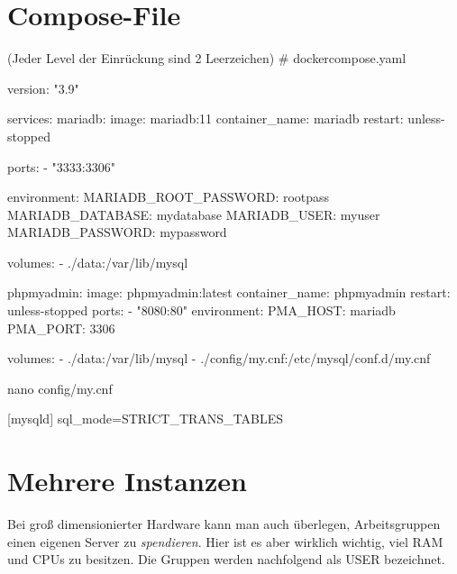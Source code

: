 \documentclass[
  ngerman,
  letterpaper,
  DIV=11]{scrreprt}
\newenvironment{Shaded}{\begin{snugshade}}{\end{snugshade}}
\newcommand{\ExtensionTok}[1]{\textcolor[rgb]{0.00,0.23,0.31}{#1}}
\newcommand{\NormalTok}[1]{\textcolor[rgb]{0.00,0.23,0.31}{#1}}
\newcommand{\StringTok}[1]{\textcolor[rgb]{0.13,0.47,0.30}{#1}}
\begin{document}
\chapter{Compose-File}\label{compose-file}

(Jeder Level der Einrückung sind 2 Leerzeichen) \# dockercompose.yaml

\begin{Shaded}
\begin{Highlighting}[]
\ExtensionTok{version:} \StringTok{"3.9"}

\ExtensionTok{services:}
  \ExtensionTok{mariadb:}
    \ExtensionTok{image:}\NormalTok{ mariadb:11}
    \ExtensionTok{container\_name:}\NormalTok{ mariadb}
    \ExtensionTok{restart:}\NormalTok{ unless{-}stopped}

    \ExtensionTok{ports:}
      \ExtensionTok{{-}} \StringTok{"3333:3306"}

    \ExtensionTok{environment:}
      \ExtensionTok{MARIADB\_ROOT\_PASSWORD:}\NormalTok{ rootpass}
      \ExtensionTok{MARIADB\_DATABASE:}\NormalTok{ mydatabase}
      \ExtensionTok{MARIADB\_USER:}\NormalTok{ myuser}
      \ExtensionTok{MARIADB\_PASSWORD:}\NormalTok{ mypassword}

    \ExtensionTok{volumes:}
      \ExtensionTok{{-}}\NormalTok{ ./data:/var/lib/mysql}
      
      
  \ExtensionTok{phpmyadmin:}
    \ExtensionTok{image:}\NormalTok{ phpmyadmin:latest}
    \ExtensionTok{container\_name:}\NormalTok{ phpmyadmin}
    \ExtensionTok{restart:}\NormalTok{ unless{-}stopped}
    \ExtensionTok{ports:}
      \ExtensionTok{{-}} \StringTok{"8080:80"}
    \ExtensionTok{environment:}
      \ExtensionTok{PMA\_HOST:}\NormalTok{ mariadb}
      \ExtensionTok{PMA\_PORT:}\NormalTok{ 3306}

    \ExtensionTok{volumes:}
      \ExtensionTok{{-}}\NormalTok{ ./data:/var/lib/mysql}
      \ExtensionTok{{-}}\NormalTok{ ./config/my.cnf:/etc/mysql/conf.d/my.cnf}
\end{Highlighting}
\end{Shaded}

nano config/my.cnf

{[}mysqld{]} sql\_mode=STRICT\_TRANS\_TABLES

\chapter{Mehrere Instanzen}\label{mehrere-instanzen}

Bei groß dimensionierter Hardware kann man auch überlegen,
Arbeitsgruppen einen eigenen Server zu \emph{spendieren}. Hier ist es
aber wirklich wichtig, viel RAM und CPUs zu besitzen. Die Gruppen werden
nachfolgend als USER bezeichnet.
\end{document}
